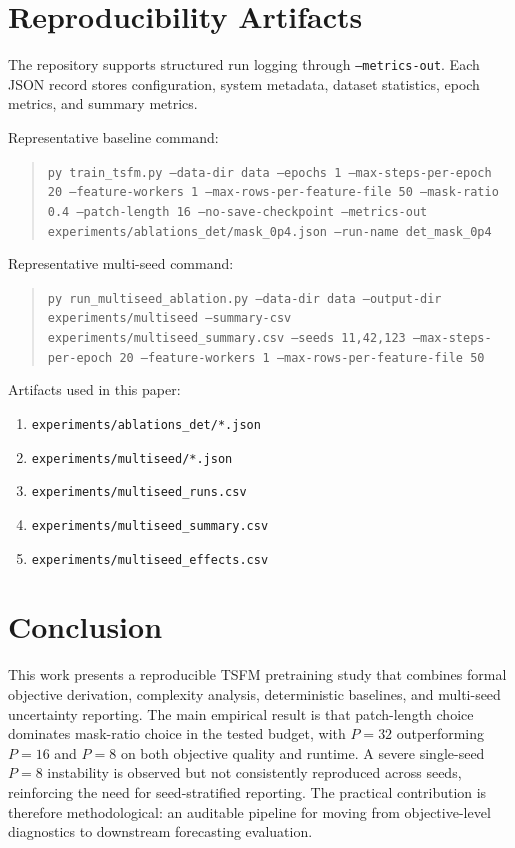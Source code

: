 \documentclass[conference]{IEEEtran}
\begin{document}
\section{Reproducibility Artifacts}
The repository supports structured run logging through \texttt{--metrics-out}. Each JSON record stores configuration, system metadata, dataset statistics, epoch metrics, and summary metrics.

Representative baseline command:
\begin{quote}
\texttt{py train\_tsfm.py --data-dir data --epochs 1 --max-steps-per-epoch 20 --feature-workers 1 --max-rows-per-feature-file 50 --mask-ratio 0.4 --patch-length 16 --no-save-checkpoint --metrics-out experiments/ablations\_det/mask\_0p4.json --run-name det\_mask\_0p4}
\end{quote}

Representative multi-seed command:
\begin{quote}
\texttt{py run\_multiseed\_ablation.py --data-dir data --output-dir experiments/multiseed --summary-csv experiments/multiseed\_summary.csv --seeds 11,42,123 --max-steps-per-epoch 20 --feature-workers 1 --max-rows-per-feature-file 50}
\end{quote}

Artifacts used in this paper:
\begin{enumerate}
    \item \texttt{experiments/ablations\_det/*.json}
    \item \texttt{experiments/multiseed/*.json}
    \item \texttt{experiments/multiseed\_runs.csv}
    \item \texttt{experiments/multiseed\_summary.csv}
    \item \texttt{experiments/multiseed\_effects.csv}
\end{enumerate}

\section{Conclusion}
This work presents a reproducible TSFM pretraining study that combines formal objective derivation, complexity analysis, deterministic baselines, and multi-seed uncertainty reporting. The main empirical result is that patch-length choice dominates mask-ratio choice in the tested budget, with $P=32$ outperforming $P=16$ and $P=8$ on both objective quality and runtime. A severe single-seed $P=8$ instability is observed but not consistently reproduced across seeds, reinforcing the need for seed-stratified reporting. The practical contribution is therefore methodological: an auditable pipeline for moving from objective-level diagnostics to downstream forecasting evaluation.
\end{document}
